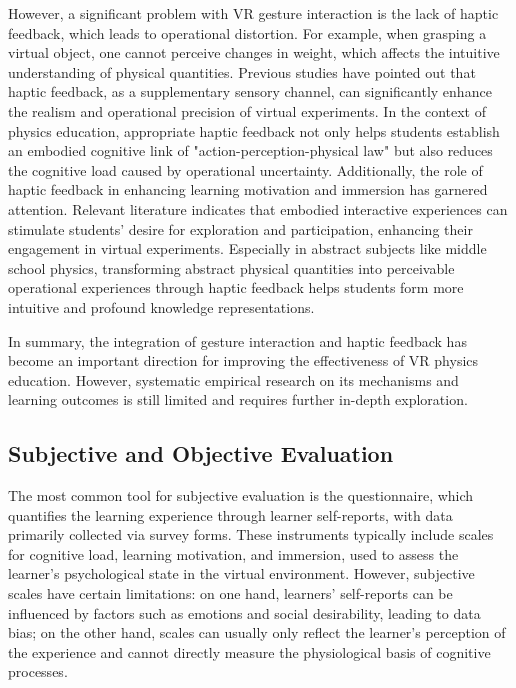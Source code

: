 \documentclass[runningheads]{llncs}
\begin{document}
However, a significant problem with VR gesture interaction is the lack of haptic feedback, which leads to operational distortion. For example, when grasping a virtual object, one cannot perceive changes in weight, which affects the intuitive understanding of physical quantities\cite{park2025ultraboard}. Previous studies have pointed out that haptic feedback, as a supplementary sensory channel, can significantly enhance the realism and operational precision of virtual experiments. In the context of physics education, appropriate haptic feedback not only helps students establish an embodied cognitive link of "action-perception-physical law" but also reduces the cognitive load caused by operational uncertainty\cite{zhai2021study}. Additionally, the role of haptic feedback in enhancing learning motivation and immersion has garnered attention. Relevant literature indicates that embodied interactive experiences can stimulate students' desire for exploration and participation, enhancing their engagement in virtual experiments\cite{kontra2015physical,lindgren2016enhancing}. Especially in abstract subjects like middle school physics, transforming abstract physical quantities into perceivable operational experiences through haptic feedback helps students form more intuitive and profound knowledge representations\cite{han2011incorporating}.

In summary, the integration of gesture interaction and haptic feedback has become an important direction for improving the effectiveness of VR physics education. However, systematic empirical research on its mechanisms and learning outcomes is still limited and requires further in-depth exploration.

\subsection{Subjective and Objective Evaluation}
The most common tool for subjective evaluation is the questionnaire, which quantifies the learning experience through learner self-reports, with data primarily collected via survey forms. These instruments typically include scales for cognitive load\cite{sweller1988cognitive}, learning motivation\cite{keller1987development}, and immersion\cite{sherman2003understanding}, used to assess the learner's psychological state in the virtual environment. However, subjective scales have certain limitations: on one hand, learners' self-reports can be influenced by factors such as emotions and social desirability, leading to data bias; on the other hand, scales can usually only reflect the learner's perception of the experience and cannot directly measure the physiological basis of cognitive processes\cite{solano2024interoceptive}.
\end{document}
